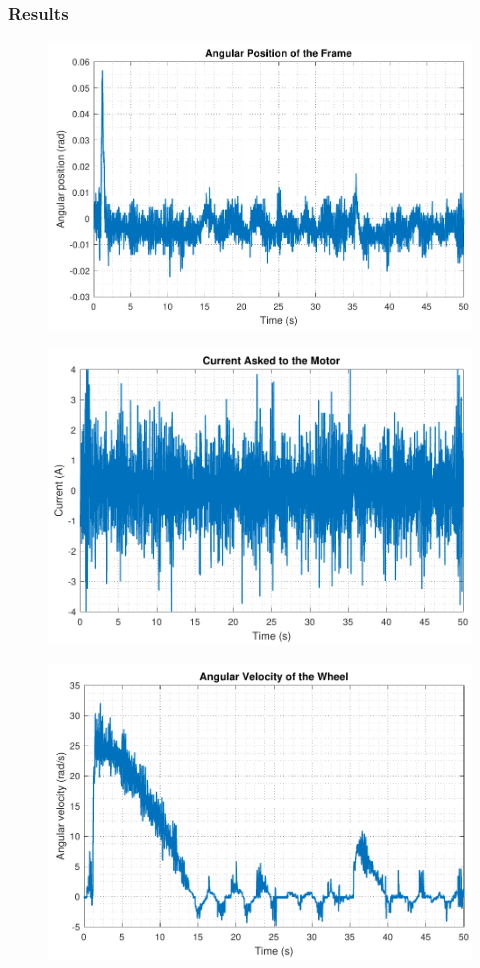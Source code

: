 \subsubsection{Results}
%
\begin{figure}[H]
	\centering
	\includegraphics[scale=.65]{figures/SISOControllerPosition}
	\label{positionTestTustinPre}
\end{figure}
%
\begin{figure}[H]
		\centering
	\includegraphics[scale=.65]{figures/SISOControllerCurrent}
	\label{torqueTestTustinPre}
\end{figure}
%
\begin{figure}[H]
		\centering
	\includegraphics[scale=.65]{figures/SISOControllerWheel}
	\label{wheelTestTustinPre}
\end{figure}


